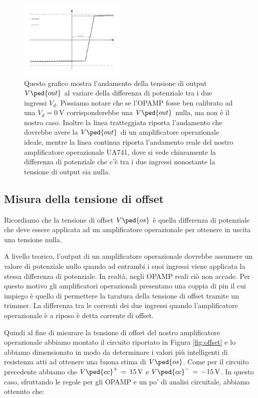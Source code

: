 \begin{figure}
	\includegraphics[width=0.45\textwidth]{../figure/offset_graph.pdf}
    \caption{Questo grafico mostra l'andamento della tensione di output $V\ped{out}$ al variare della differenza di potenziale tra i due ingressi $V_d$. Possiamo notare che se l'OPAMP fosse ben calibrato ad una $V_d=\SI{0}{\volt}$ corrisponderebbe una $V\ped{out}$ nulla, ma non è il nostro caso. Inoltre la linea tratteggiata riporta l'andamento che dovrebbe avere la $V\ped{out}$ di un amplificatore operazionale ideale, mentre la linea continua riporta l'andamento reale del nostro amplificatore operazionale UA741, dove si vede chiaramente la differenza di potenziale che c'è tra i due ingressi nonostante la tensione di output sia nulla.}
    \label{fig:plot_Vd}
\end{figure}

\subsection*{Misura della tensione di offset}

Ricordiamo che la tensione di offset $V\ped{os}$ è quella differenza di potenziale che deve essere applicata ad un amplificatore operazionale per ottenere in uscita una tensione nulla.

A livello teorico, l'output di un amplificatore operazionale dovrebbe assumere un valore di potenziale nullo quando ad entrambi i suoi ingressi viene applicata la stessa differenza di potenziale. In realtà, negli OPAMP reali ciò non accade. Per questo motivo gli amplificatori operazionali presentano una coppia di pin il cui impiego è quello di permettere la taratura della tensione di offset tramite un trimmer. La differenza tra le correnti dei due ingressi quando l'amplificatore operazionale è a riposo è detta corrente di offset.

Quindi al fine di misurare la tensione di offset del nostro amplificatore operazionale abbiamo montato il circuito riportato in Figura \ref{fig:offset} e lo abbiamo dimensionato in modo da determinare i valori più intelligenti di resistenza atti ad ottenere una buona stima di $V\ped{os}$.
Come per il circuito precedente abbiamo che $V\ped{cc}^+\,=\,\SI{+15}{\volt}$ e $V\ped{cc}^-\,=\,\SI{-15}{\volt}$.
In questo caso, sfruttando le regole per gli OPAMP e un po' di analisi circuitale, abbiamo ottenuto che:

